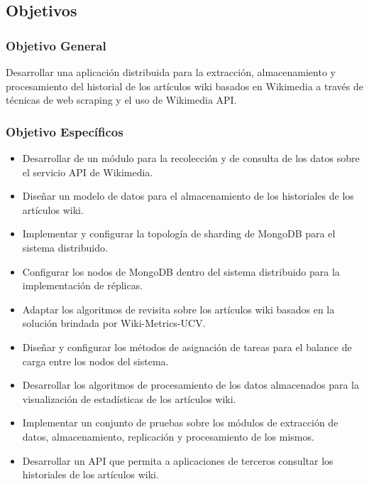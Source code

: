 \subsection{Objetivos}

\subsubsection{Objetivo General}

Desarrollar una aplicación distribuida para la extracción, almacenamiento y
procesamiento del historial de los artículos wiki basados en Wikimedia a través de
técnicas de web scraping y el uso de Wikimedia API.

\subsubsection{Objetivo Específicos}


\begin{itemize}
\item Desarrollar de un módulo para la recolección y de consulta de los datos sobre el
servicio API de Wikimedia.

\item Diseñar un modelo de datos para el almacenamiento de los historiales de los
artículos wiki.

\item Implementar y configurar la topología de sharding de MongoDB para el sistema
distribuido.

\item Configurar los nodos de MongoDB dentro del sistema distribuido para la
implementación de réplicas.

\item Adaptar los algoritmos de revisita sobre los artículos wiki basados en la solución
brindada por Wiki-Metrics-UCV.

\item Diseñar y configurar los métodos de asignación de tareas para el balance de
carga entre los nodos del sistema.

\item Desarrollar los algoritmos de procesamiento de los datos almacenados para la
visualización de estadísticas de los artículos wiki.

\item Implementar un conjunto de pruebas sobre los módulos de extracción de datos,
almacenamiento, replicación y procesamiento de los mismos.

\item Desarrollar un API que permita a aplicaciones de terceros consultar los
historiales de los artículos wiki.

\end{itemize}
